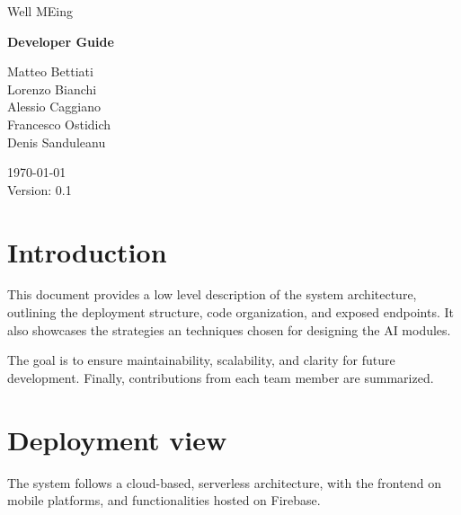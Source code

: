 \documentclass{article}
\begin{document}


\begin{center}

	\fontsize{20pt}{30pt}\selectfont
	Well MEing

	\vspace{2cm}

	\fontsize{25pt}{45pt}\selectfont
	\textbf{Developer Guide}

	\vfill

	\fontsize{12pt}{18pt}\selectfont
	Matteo Bettiati \\
	Lorenzo Bianchi \\
	Alessio Caggiano \\
	Francesco Ostidich \\
	Denis Sanduleanu \\

	\vspace{1cm}

	\today \\
	\vspace{12pt}
	Version: 0.1
	\normalsize

\end{center}

\newpage
{}
\tableofcontents
\newpage



\section{Introduction}

This document provides a low level description of the system architecture, outlining the deployment structure, code organization, and exposed endpoints.
It also showcases the strategies an techniques chosen for designing the AI modules.

The goal is to ensure maintainability, scalability, and clarity for future development.
Finally, contributions from each team member are summarized.

\section{Deployment view}

The system follows a cloud-based, serverless architecture, with the frontend on mobile platforms, and functionalities hosted on Firebase.
\end{document}
